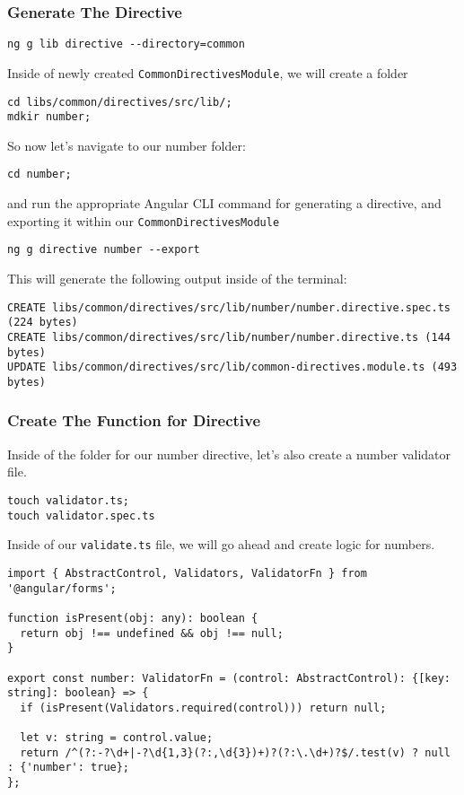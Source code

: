 \subsubsection{Generate The Directive}
\begin{verbatim}
ng g lib directive --directory=common  
\end{verbatim}

Inside of newly created \lstinline{CommonDirectivesModule}, we will create 
a folder 
\begin{verbatim}
cd libs/common/directives/src/lib/;
mdkir number; 
\end{verbatim}

So now let's navigate to our number folder:
\begin{verbatim}
cd number;  
\end{verbatim}  

and run the appropriate Angular CLI command for generating a directive, 
and exporting it within our \lstinline{CommonDirectivesModule}

\begin{verbatim}
ng g directive number --export  
\end{verbatim}

This will generate the following output inside of the terminal: 
\begin{verbatim}
CREATE libs/common/directives/src/lib/number/number.directive.spec.ts (224 bytes)
CREATE libs/common/directives/src/lib/number/number.directive.ts (144 bytes)
UPDATE libs/common/directives/src/lib/common-directives.module.ts (493 bytes)
\end{verbatim}

\subsubsection{Create The Function for Directive}
Inside of the folder for our number directive, let's also create a number validator file.

\begin{verbatim}
touch validator.ts;
touch validator.spec.ts
\end{verbatim}

Inside of our \lstinline{validate.ts} file, we will go ahead and create logic for numbers.

\begin{lstlisting}[caption=number-validator.ts]
import { AbstractControl, Validators, ValidatorFn } from '@angular/forms';

function isPresent(obj: any): boolean {
  return obj !== undefined && obj !== null;
}

export const number: ValidatorFn = (control: AbstractControl): {[key: string]: boolean} => {
  if (isPresent(Validators.required(control))) return null;

  let v: string = control.value;
  return /^(?:-?\d+|-?\d{1,3}(?:,\d{3})+)?(?:\.\d+)?$/.test(v) ? null : {'number': true};
}; 
\end{lstlisting}


